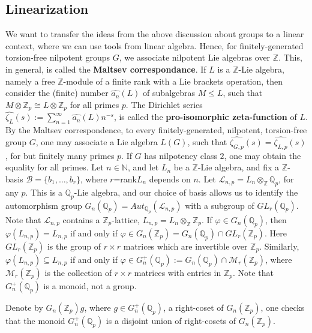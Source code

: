\documentclass[12pt]{article}
\begin{document}
\subsection{Linearization}
We want to transfer the ideas from the above discussion about groups to a linear context, where we can use tools from linear algebra.
Hence, for finitely-generated torsion-free nilpotent groups $G$, we associate nilpotent Lie algebras over $\mathbb{Z}$. This, in general, is called the \textbf{Maltsev correspondance}. 
If $L$ is a $\mathbb{Z}$-Lie algebra, namely a free $\mathbb{Z}$-module of a finite rank with a Lie brackets operation, then consider the (finite) number $\hat{a_n}(L)$ of subalgebras $M\leq L$, such that $M\otimes\mathbb{Z}_p\cong L\otimes\mathbb{Z}_p$ for all primes $p$. The Dirichlet series $\hat{\zeta_L}(s):=\sum_{n=1}^{\infty}\hat{a_n}(L)n^{-s}$, is called the \textbf{pro-isomorphic zeta-function} of $L$. By the Maltsev correspondence, to every finitely-generated, nilpotent, torsion-free group $G$, one may associate a Lie algebra $L(G)$, such that $\hat{\zeta_{G,p}}(s)=\hat{\zeta_{L,p}}(s)$, for but finitely many primes $p$. If $G$ has nilpotency class $2$, one may obtain the equality for all primes. Let $n\in\mathbb{N}$, and let $L_n$ be a $\mathbb{Z}$-Lie algebra, and fix a $\mathbb{Z}$-basis $\mathcal{B}=\{b_1,\dots,b_r\}$, where $r$=rank$L_n$ depends on $n$. Let $\mathcal{L}_{n,p}=L_n\otimes_{\mathbb{Z}}\mathbb{Q}_p$, for any $p$. This is a $\mathbb{Q}_p$-Lie algebra, and our choice of basis allows us to identify the automorphism group $G_n(\mathbb{Q}_p)=Aut_{\mathbb{Q}_p}(\mathcal{L}_{n,p})$ with a subgroup of $GL_r(\mathbb{Q}_p)$. Note that $\mathcal{L}_{n,p}$ contains a $\mathbb{Z}_p$-lattice, $L_{n,p}=L_n\otimes_{\mathbb{Z}}\mathbb{Z}_p$. If $\varphi\in G_n(\mathbb{Q}_p)$, then $\varphi(L_{n,p})=L_{n,p}$ if and only if $\varphi\in G_n(\mathbb{Z}_p)=G_n(\mathbb{Q}_p)\cap GL_r(\mathbb{Z}_p)$. Here $GL_r(\mathbb{Z}_p)$ is the group of $r\times r$ matrices which are invertible over $\mathbb{Z}_p$. Similarly, $\varphi(L_{n,p})\subseteq L_{n,p}$ if and only if $\varphi\in G^+_n(\mathbb{Q}_p):=G_n(\mathbb{Q}_p)\cap \mathcal{M}_r(\mathbb{Z}_p)$, where $\mathcal{M}_r(\mathbb{Z}_p)$ is the collection of $r\times r$ matrices with entries in $\mathbb{Z}_p$. Note that $G^+_n(\mathbb{Q}_p)$ is a monoid, not a group.\par
Denote by $G_n(\mathbb{Z}_p)g$, where $g\in G^+_n(\mathbb{Q}_p)$, a right-coset of $G_n(\mathbb{Z}_p)$, one checks that the monoid $G^+_n(\mathbb{Q}_p)$ is a disjoint union of right-cosets of $G_n(\mathbb{Z}_p)$.\par
\end{document}
